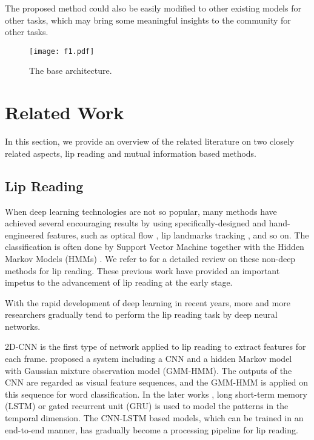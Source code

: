 \documentclass[a4paper, 10pt, conference]{ieeeconf}      \usepackage{FG2020}
\begin{document}
The proposed method could also be easily modified to other existing models for other tasks, which may bring some meaningful insights to the community for other tasks.
   \begin{figure*}
   

      \centering
      \texttt{[image: f1.pdf]}
      \caption{The base architecture.}
    \label{fig:1}
   \end{figure*} \section{Related Work}
In this section, we provide an overview of the related literature on two closely related aspects, lip reading and mutual information based methods.
\subsection{Lip Reading}
When deep learning technologies are not so popular, many methods have achieved several encouraging results by using specifically-designed and hand-engineered features, such as optical flow \cite{shaikh2010lip}, lip landmarks tracking \cite{duchnowski1995toward}, and so on. The classification is often done by Support Vector Machine \cite{shaikh2010lip} together with the Hidden Markov Models (HMMs) \cite{chandrasekaran2009natural,papandreou2009adaptive}. We refer to \cite{zhou2014review,potamianos2004audio} for a detailed review on these non-deep methods for lip reading. These previous work have provided an important impetus to the advancement of lip reading at the early stage.

With the rapid development of deep learning in recent years, more and more researchers gradually tend to perform the lip reading task by deep neural networks. 

2D-CNN is the first type of network applied to lip reading to extract features for each frame. \cite{noda2014lipreading} proposed a system including a CNN and a hidden Markov model with Gaussian mixture observation model (GMM-HMM). The outputs of the CNN are regarded as visual feature sequences, and the GMM-HMM is applied on this sequence for word classification. In the later works \cite{wand2016lipreading,chung2017lip}, long short-term memory (LSTM) or gated recurrent unit (GRU) is used to model the patterns in the temporal dimension. The CNN-LSTM based models, which can be trained in an end-to-end manner, has gradually become a processing pipeline for lip reading.
\end{document}
